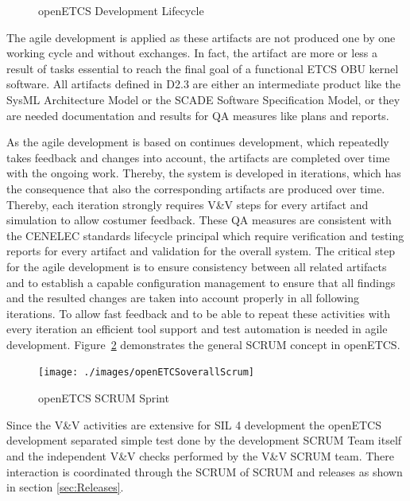 \begin{figure}[hbt]
  \centering
  \def\svgwidth{.9\textwidth}
  {\tiny
  }
  \caption{openETCS Development Lifecycle}
  \label{fig:lifecycle2}
\end{figure}


The agile development is applied as these artifacts are not produced one by one working cycle and without exchanges. In fact, the artifact are more or less a result of tasks essential to reach the final goal of a functional ETCS OBU kernel software. All artifacts defined in D2.3 are either an intermediate product like the SysML Architecture Model or the SCADE Software Specification Model, or they are needed documentation and results for QA measures like plans and reports.

As the agile development is based on continues development, which repeatedly takes feedback and changes into account, the artifacts are completed over time with the ongoing work. Thereby, the system is developed in iterations, which has the consequence that also the corresponding artifacts are produced over time. Thereby, each iteration strongly requires V\&V steps for every artifact and simulation to allow costumer feedback. These QA measures are consistent with the CENELEC standards lifecycle principal which require verification and testing reports for every artifact and validation for the overall system. The critical step for the agile development is to ensure consistency between all related artifacts and to establish a capable configuration management to ensure that all findings and the resulted changes are taken into account properly in all following iterations. To allow fast feedback and to be able to repeat these activities with every iteration an efficient tool support and test automation is needed in agile development. Figure~\ref{fig:openETCSSCRUMSprint} demonstrates the general SCRUM concept in openETCS.

\begin{figure}[hbt]
\centering
\texttt{[image: ./images/openETCSoverallScrum]}
\caption{openETCS SCRUM Sprint}
\label{fig:openETCSSCRUMSprint}
\end{figure}

Since the V\&V activities are extensive for SIL 4 development the openETCS development separated simple test done by the development SCRUM Team itself and the independent V\&V checks performed by the V\&V SCRUM team. There interaction is coordinated through the SCRUM of SCRUM and releases as shown in section \ref{sec:Releases}.

